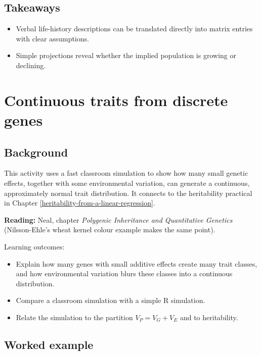 \documentclass[
  a4paper]{book}
\providecommand{\tightlist}{%
  \setlength{\itemsep}{0pt}\setlength{\parskip}{0pt}}
\begin{document}
\section{Takeaways}\label{takeaways-24}

\begin{itemize}
\tightlist
\item
  Verbal life-history descriptions can be translated directly into matrix entries with clear assumptions.
\item
  Simple projections reveal whether the implied population is growing or declining.
\end{itemize}

\chapter{Continuous traits from discrete genes}\label{continuous-traits-from-discrete-genes}

\section{Background}\label{background-21}

This activity uses a fast classroom simulation to show how many small genetic effects, together with some environmental variation, can generate a continuous, approximately normal trait distribution. It connects to the heritability practical in Chapter \ref{heritability-from-a-linear-regression}.

\textbf{Reading:} Neal, chapter \emph{Polygenic Inheritance and Quantitative Genetics} (Nilsson-Ehle's wheat kernel colour example makes the same point).

Learning outcomes:

\begin{itemize}
\tightlist
\item
  Explain how many genes with small additive effects create many trait classes, and how environmental variation blurs these classes into a continuous distribution.
\item
  Compare a classroom simulation with a simple R simulation.
\item
  Relate the simulation to the partition \(V_P = V_G + V_E\) and to heritability.
\end{itemize}

\section{Worked example}\label{worked-example-11}
\end{document}
